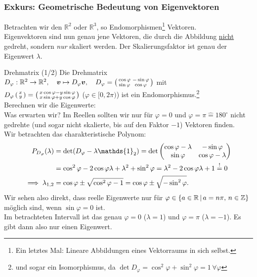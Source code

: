\subsubsection{Exkurs: Geometrische Bedeutung von Eigenvektoren}
Betrachten wir den $\mathbb{R}^2$ oder $\mathbb{R}^3$, so  Endomorphismen\footnote{Ein letztes Mal: Lineare Abbildungen eines Vektorraums in sich selbst.} Vektoren.\\
Eigenvektoren sind nun genau jene Vektoren, die durch die Abbildung \underline{nicht} gedreht, sondern \textit{nur} skaliert werden. Der Skalierungsfaktor ist genau der Eigenwert $\lambda$.

\begin{Beispiel}{Drehmatrix (1/2)}
Die Drehmatrix $D_\varphi:\mathbb{R}^2\to\mathbb{R}^2,\quad {\text{\boldmath${v}$}}\mapsto D_\varphi {\text{\boldmath${v}$}},\quad D_\varphi=\left(\begin{smallmatrix}\cos\varphi&-\sin\varphi\\\sin\varphi&\cos\varphi\end{smallmatrix}\right)$ mit\\
$D_\varphi\left(\begin{smallmatrix}x\\y\end{smallmatrix}\right)=\left(\begin{smallmatrix}x\cos\varphi-y\sin\varphi\\x\sin\varphi+y\cos\varphi\end{smallmatrix}\right)$ ($\varphi\in[0,2\pi)$) ist ein Endomorphismus.\footnote{und sogar ein Isomorphismus, da $\det D_\varphi=\cos^2\varphi+\sin^2\varphi=1\,\forall\varphi$}\\
Berechnen wir die Eigenwerte:\\
Was erwarten wir? Im Reellen sollten wir nur für $\varphi=0$ und $\varphi=\pi\hat{=}180^\circ$ nicht gedrehte (und sogar nicht skalierte, bis auf den Faktor $-1$) Vektoren finden.\\
Wir betrachten das charakteristische Polynom:
\begin{align*}
P_{D_\varphi}(\lambda)&=\det(D_\varphi-\lambda\mathds{1}_2)=\det\Matrix{\cos\varphi-\lambda&-\sin\varphi\\\sin\varphi&\cos\varphi-\lambda}\\
&=\cos^2\varphi-2\cos\varphi\lambda+\lambda^2+\sin^2\varphi=\lambda^2-2\cos\varphi\lambda+1\overset{!}{=}0\\
\implies \lambda_{1,2}&=\cos\varphi\pm\sqrt{\cos^2\varphi-1}=\cos\varphi\pm\sqrt{-\sin^2\varphi}.
\end{align*}
Wir sehen also direkt, dass reelle Eigenwerte nur für $\varphi\in\left\{a\in\mathbb{R}\,|\, a=n\pi,\,n\in\mathbb{Z}\right\}$ möglich sind, wenn $\sin\varphi=0$ ist.\\
Im betrachteten Intervall ist das genau $\varphi=0$ ($\lambda=1$) und $\varphi=\pi$ ($\lambda=-1$). Es gibt dann also nur einen Eigenwert.\\

\end{Beispiel}
